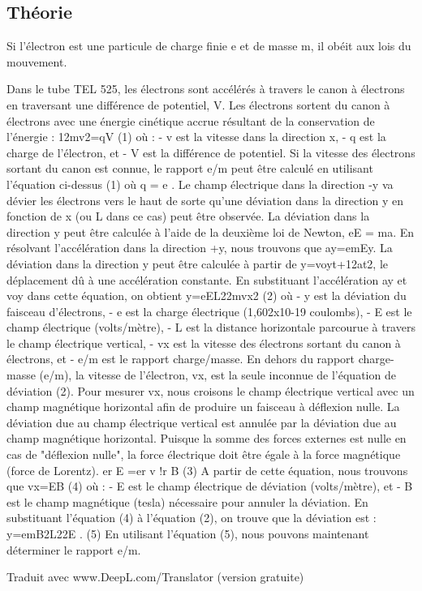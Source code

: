 \documentclass[../main.tex]{subfiles}
\begin{document}
\subsection{Théorie}
Si l'électron est une particule de charge finie e et de masse m, il obéit aux lois du mouvement. \\
\par Dans le tube TEL 525, les électrons sont accélérés à travers le canon à électrons en traversant une différence de potentiel, V. Les électrons sortent du canon à électrons avec une énergie cinétique accrue résultant de la conservation de l'énergie : 12mv2=qV (1) où : - v est la vitesse dans la direction x, - q est la charge de l'électron, et - V est la différence de potentiel.  Si la vitesse des électrons sortant du canon est connue, le rapport e/m peut être calculé en utilisant l'équation ci-dessus (1) où q = e .  Le champ électrique dans la direction -y va dévier les électrons vers le haut de sorte qu'une déviation dans la direction y en fonction de x (ou L dans ce cas) peut être observée.  La déviation dans la direction y peut être calculée à l'aide de la deuxième loi de Newton, eE = ma.  En résolvant l'accélération dans la direction +y, nous trouvons que ay=emEy. La déviation dans la direction y peut être calculée à partir de y=voyt+12at2, le déplacement dû à une accélération constante.    En substituant l'accélération ay et voy dans cette équation, on obtient y=eEL22mvx2 (2) où - y est la déviation du faisceau d'électrons, - e est la charge électrique (1,602x10-19 coulombs), - E est le champ électrique (volts/mètre), - L est la distance horizontale parcourue à travers le champ électrique vertical, - vx est la vitesse des électrons sortant du canon à électrons, et - e/m est le rapport charge/masse.  En dehors du rapport charge-masse (e/m), la vitesse de l'électron, vx, est la seule inconnue de l'équation de déviation (2).  Pour mesurer vx, nous croisons le champ électrique vertical avec un champ magnétique horizontal afin de produire un faisceau à déflexion nulle.  La déviation due au champ électrique vertical est annulée par la déviation due au champ magnétique horizontal.  Puisque la somme des forces externes est nulle en cas de "déflexion nulle", la force électrique doit être égale à la force magnétique (force de Lorentz). er E =er v !r B (3) A partir de cette équation, nous trouvons que vx=EB (4) où : - E est le champ électrique de déviation (volts/mètre), et - B est le champ magnétique (tesla) nécessaire pour annuler la déviation.  En substituant l'équation (4) à l'équation (2), on trouve que la déviation est : y=emB2L22E .                  (5) En utilisant l'équation (5), nous pouvons maintenant déterminer le rapport e/m. 

Traduit avec www.DeepL.com/Translator (version gratuite)
\end{document}
